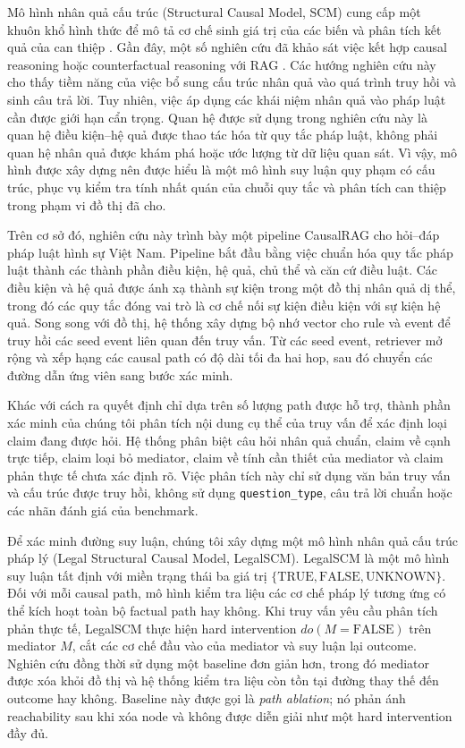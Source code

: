 Mô hình nhân quả cấu trúc (Structural Causal Model, SCM) cung cấp một khuôn
khổ hình thức để mô tả cơ chế sinh giá trị của các biến và phân tích kết quả
của can thiệp \cite{pearl2009causality}. Gần đây, một số nghiên cứu đã khảo
sát việc kết hợp causal reasoning hoặc counterfactual reasoning với RAG
\cite{wang2025causalrag,khadilkar2025causalcounterfactualrag,qin2026cfrag}.
Các hướng nghiên cứu này cho thấy tiềm năng của việc bổ sung cấu trúc nhân
quả vào quá trình truy hồi và sinh câu trả lời. Tuy nhiên, việc áp dụng các
khái niệm nhân quả vào pháp luật cần được giới hạn cẩn trọng. Quan hệ được
sử dụng trong nghiên cứu này là quan hệ điều kiện--hệ quả được thao tác hóa
từ quy tắc pháp luật, không phải quan hệ nhân quả được khám phá hoặc ước
lượng từ dữ liệu quan sát. Vì vậy, mô hình được xây dựng nên được hiểu là
một mô hình suy luận quy phạm có cấu trúc, phục vụ kiểm tra tính nhất quán
của chuỗi quy tắc và phân tích can thiệp trong phạm vi đồ thị đã cho.

Trên cơ sở đó, nghiên cứu này trình bày một pipeline CausalRAG cho hỏi--đáp
pháp luật hình sự Việt Nam. Pipeline bắt đầu bằng việc chuẩn hóa quy tắc
pháp luật thành các thành phần điều kiện, hệ quả, chủ thể và căn cứ điều
luật. Các điều kiện và hệ quả được ánh xạ thành sự kiện trong một đồ thị
nhân quả dị thể, trong đó các quy tắc đóng vai trò là cơ chế nối sự kiện
điều kiện với sự kiện hệ quả. Song song với đồ thị, hệ thống xây dựng bộ nhớ
vector cho rule và event để truy hồi các seed event liên quan đến truy vấn.
Từ các seed event, retriever mở rộng và xếp hạng các causal path có độ dài
tối đa hai hop, sau đó chuyển các đường dẫn ứng viên sang bước xác minh.

Khác với cách ra quyết định chỉ dựa trên số lượng path được hỗ trợ, thành
phần xác minh của chúng tôi phân tích nội dung cụ thể của truy vấn để xác
định loại claim đang được hỏi. Hệ thống phân biệt câu hỏi nhân quả chuẩn,
claim về cạnh trực tiếp, claim loại bỏ mediator, claim về tính cần thiết của
mediator và claim phản thực tế chưa xác định rõ. Việc phân tích này chỉ sử
dụng văn bản truy vấn và cấu trúc được truy hồi, không sử dụng
\texttt{question\_type}, câu trả lời chuẩn hoặc các nhãn đánh giá của
benchmark.

Để xác minh đường suy luận, chúng tôi xây dựng một mô hình nhân quả cấu trúc
pháp lý (Legal Structural Causal Model, LegalSCM). LegalSCM là một mô hình
suy luận tất định với miền trạng thái ba giá trị
$\{\mathrm{TRUE},\mathrm{FALSE},\mathrm{UNKNOWN}\}$. Đối với mỗi causal
path, mô hình kiểm tra liệu các cơ chế pháp lý tương ứng có thể kích hoạt
toàn bộ factual path hay không. Khi truy vấn yêu cầu phân tích phản thực tế,
LegalSCM thực hiện hard intervention $do(M=\mathrm{FALSE})$ trên mediator
$M$, cắt các cơ chế đầu vào của mediator và suy luận lại outcome. Nghiên cứu
đồng thời sử dụng một baseline đơn giản hơn, trong đó mediator được xóa khỏi
đồ thị và hệ thống kiểm tra liệu còn tồn tại đường thay thế đến outcome hay
không. Baseline này được gọi là \emph{path ablation}; nó phản ánh
reachability sau khi xóa node và không được diễn giải như một hard
intervention đầy đủ.

